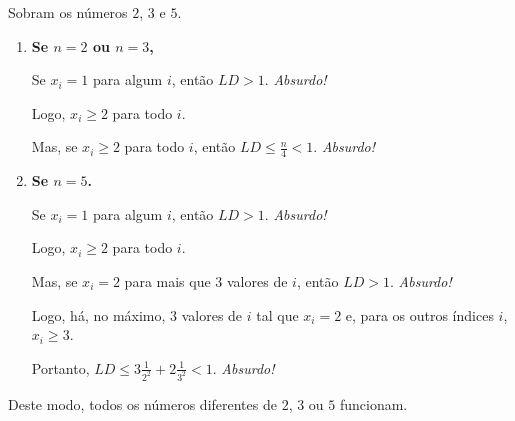 \begin{enumerate}[label = (\alph*)]
		Sobram os números $2$, $3$ e $5$.

		\begin{enumerate}[label = \bfseries \Alph*.]
			\item \textbf{Se $n = 2$ ou $n = 3$,}
				
				Se $x_i = 1$ para algum $i$, então $LD > 1$. \hfill \textit{Absurdo!}

				Logo, $x_i \ge 2$ para todo $i$.
				
				Mas, se $x_i \ge 2$ para todo $i$, então $LD \le \frac{n}{4} < 1$. \hfill \textit{Absurdo!}

			\item \textbf{Se $n = 5$.}

				Se $x_i = 1$ para algum $i$, então $LD > 1$. \hfill \textit{Absurdo!}

				Logo, $x_i \ge 2$ para todo $i$.

				Mas, se $x_i = 2$ para mais que $3$ valores de $i$, então $LD > 1$. \hfill \textit{Absurdo!}

				Logo, há, no máximo, $3$ valores de $i$ tal que $x_i = 2$ e, para os outros índices $i$, $x_i \ge 3$.
				
				Portanto, $LD \le 3\frac{1}{2^2} + 2\frac{1}{3^2} < 1$. \hfill \textit{Absurdo!}
		\end{enumerate}

		Deste modo, todos os números diferentes de $2$, $3$ ou $5$ funcionam.
	
\end{enumerate}
